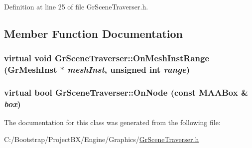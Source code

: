 Definition at line 25 of file GrSceneTraverser.h.

\subsection{Member Function Documentation}
\hypertarget{class_gr_scene_traverser_4b78a9ad02a45670f5f3f7544ac3f411}{
\subsubsection[{OnMeshInstRange}]{\setlength{\rightskip}{0pt plus 5cm}virtual void GrSceneTraverser::OnMeshInstRange ({\bf GrMeshInst} $\ast$ {\em meshInst}, \/  unsigned int {\em range})}}
\label{class_gr_scene_traverser_4b78a9ad02a45670f5f3f7544ac3f411}


\hypertarget{class_gr_scene_traverser_f6c83b18404f6b8c9e20824676eb19f8}{
\subsubsection[{OnNode}]{\setlength{\rightskip}{0pt plus 5cm}virtual bool GrSceneTraverser::OnNode (const {\bf MAABox} \& {\em box})}}
\label{class_gr_scene_traverser_f6c83b18404f6b8c9e20824676eb19f8}




The documentation for this class was generated from the following file:\begin{CompactItemize}
\item 
C:/Bootstrap/ProjectBX/Engine/Graphics/\hyperlink{_gr_scene_traverser_8h}{GrSceneTraverser.h}\end{CompactItemize}
